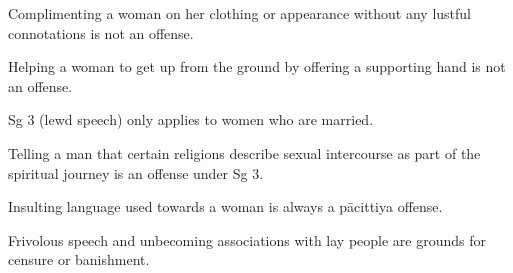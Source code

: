 \begin{exam}{\autoExamName}
\begin{problem*}
  \bigskip

  \begin{parts}

    \item {} Complimenting a woman on her clothing or appearance without any
    lustful connotations is not an offense.

    \bigskip

    \item {} Helping a woman to get up from the ground by offering a
    supporting hand is not an offense.

    \bigskip

    \item {} Sg 3 (lewd speech) only applies to women who are married.

    \bigskip

    \item {} Telling a man that certain religions describe sexual
    intercourse as part of the spiritual journey is an offense under Sg 3.

    \bigskip

    \item {} Insulting language used towards a woman is always a pācittiya offense.

    \bigskip

    \item {} Frivolous speech and unbecoming associations with lay people
    are grounds for censure or banishment.

  \end{parts}

\end{problem*}

\end{exam}

